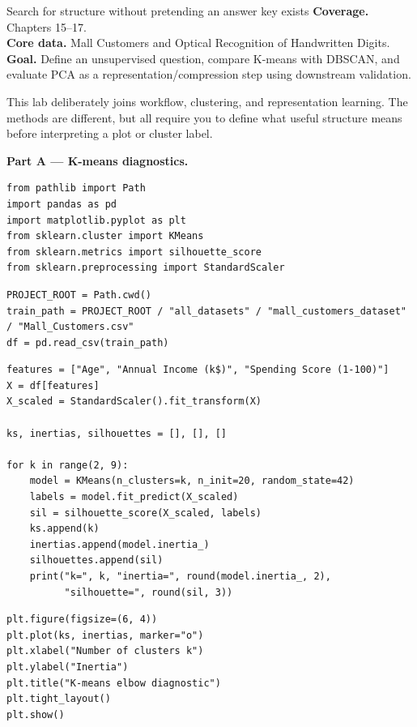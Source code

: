 
\begin{labproject}{Search for structure without pretending an answer key exists}
\textbf{Coverage.} Chapters 15--17.\\
\textbf{Core data.} Mall Customers and Optical Recognition of Handwritten Digits.\\
\textbf{Goal.} Define an unsupervised question, compare K-means with DBSCAN, and evaluate PCA as a representation/compression step using downstream validation.

\begin{labmode}
This lab deliberately joins workflow, clustering, and representation learning. The methods are different, but all require you to define what useful structure means before interpreting a plot or cluster label.
\end{labmode}

\medskip\noindent\textbf{Part A --- K-means diagnostics.}\par
\begin{lstlisting}[style=mlpython]
from pathlib import Path
import pandas as pd
import matplotlib.pyplot as plt
from sklearn.cluster import KMeans
from sklearn.metrics import silhouette_score
from sklearn.preprocessing import StandardScaler
\end{lstlisting}

\begin{lstlisting}[style=mlpython]
PROJECT_ROOT = Path.cwd()
train_path = PROJECT_ROOT / "all_datasets" / "mall_customers_dataset" / "Mall_Customers.csv"
df = pd.read_csv(train_path)
\end{lstlisting}

\begin{lstlisting}[style=mlpython]
features = ["Age", "Annual Income (k$)", "Spending Score (1-100)"]
X = df[features]
X_scaled = StandardScaler().fit_transform(X)

ks, inertias, silhouettes = [], [], []

for k in range(2, 9):
    model = KMeans(n_clusters=k, n_init=20, random_state=42)
    labels = model.fit_predict(X_scaled)
    sil = silhouette_score(X_scaled, labels)
    ks.append(k)
    inertias.append(model.inertia_)
    silhouettes.append(sil)
    print("k=", k, "inertia=", round(model.inertia_, 2),
          "silhouette=", round(sil, 3))
\end{lstlisting}

\begin{lstlisting}[style=mlpython]
plt.figure(figsize=(6, 4))
plt.plot(ks, inertias, marker="o")
plt.xlabel("Number of clusters k")
plt.ylabel("Inertia")
plt.title("K-means elbow diagnostic")
plt.tight_layout()
plt.show()
\end{lstlisting}


\end{labproject}
